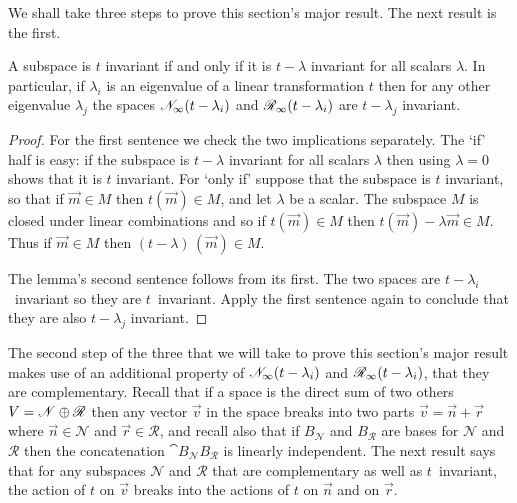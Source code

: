 
We shall take three steps to prove this section's major result. 
The next result is the first.

\begin{lemma} \label{le:tInvIfftMinLambdaInv}
A subspace is \( t \) invariant if and only if 
it is \( t-\lambda \) invariant for all scalars \( \lambda \).
In particular, 
if \( \lambda_i \) is an eigenvalue of  a linear transformation
\( t \) then for any other eigenvalue $\lambda_j$
the spaces \( \mathscr{N}_\infty(t-\lambda_i) \) 
and \( \mathscr{R}_\infty(t-\lambda_i) \)
are \( t-\lambda_j \) invariant.
\end{lemma}

\begin{proof}
For the first sentence we check the two implications separately.
The `if' half is easy: if the subspace is $t-\lambda$ invariant for 
all scalars $\lambda$ then using $\lambda=0$ shows that it is $t$ invariant.
For `only if' suppose that the subspace is $t$ invariant,
so that if $\vec{m}\in M$ then $t(\vec{m})\in M$, and let $\lambda$ be 
a scalar.
The subspace $M$ is closed under linear combinations and so if 
$t(\vec{m})\in M$ then $t(\vec{m})-\lambda\vec{m}\in M$.
Thus if $\vec{m}\in M$ then $(t-\lambda)\,(\vec{m})\in M$.

The lemma's second sentence follows from its first.
The
two spaces are $t-\lambda_i$~invariant so they are \( t \)~invariant.
Apply the first sentence again to
conclude that they are also \( t-\lambda_j \) invariant.
\end{proof}

The second step of the three that we will take to prove this
section's major result makes use of an additional property of 
\( \mathscr{N}_\infty(t-\lambda_i) \) and
\( \mathscr{R}_\infty(t-\lambda_i) \), that they are complementary.
Recall that if a space is the direct sum of two others 
\( V=\mathscr{N}\oplus \mathscr{R} \) 
then any vector \( \vec{v} \) in the space breaks into
two parts \( \vec{v}=\vec{n}+\vec{r} \) where \( \vec{n}\in \mathscr{N} \) and
\( \vec{r}\in \mathscr{R} \), and recall also 
that if \( B_{\mathscr{N}} \) and \( B_{\mathscr{R}} \) are bases for
\( \mathscr{N} \) and \( \mathscr{R} \) then the concatenation
\( \cat{B_{\mathscr{N}}}{B_{\mathscr{R}}} \) is linearly independent.
The next result says that for any subspaces
\( \mathscr{N} \) and \( \mathscr{R} \) that are complementary 
as well as \( t \)~invariant,
the action
of \( t \) on \( \vec{v} \) breaks into the actions of
\( t \) on \( \vec{n} \) and on \( \vec{r} \).


